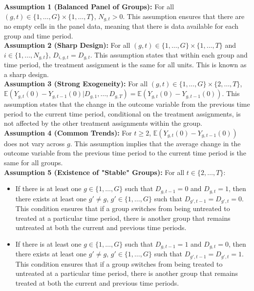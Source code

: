 \documentclass[10pt, oneside]{book}
\begin{document}
\textbf{Assumption 1 (Balanced Panel of Groups):} For all $(g,t) \in \{1, \ldots, G\} \times \{1, \ldots, T\}$, $N_{g,t} > 0$. This assumption ensures that there are no empty cells in the panel data, meaning that there is data available for each group and time period. \\

\textbf{Assumption 2 (Sharp Design):} For all $(g,t) \in \{1, \ldots, G\} \times \{1, \ldots, T\}$ and $i \in \{1, \ldots, N_{g,t}\}$, $D_{i,g,t} = D_{g,t}$. This assumption states that within each group and time period, the treatment assignment is the same for all units. This is known as a sharp design. \\

\textbf{Assumption 3 (Strong Exogeneity):} For all $(g,t) \in \{1, \ldots, G\} \times \{2, \ldots, T\}$, $\mathbb{E}(Y_{g,t}(0) - Y_{g,t-1}(0) | D_{g,1}, \ldots, D_{g,T}) = \mathbb{E}(Y_{g,t}(0) - Y_{g,t-1}(0))$. This assumption states that the change in the outcome variable from the previous time period to the current time period, conditional on the treatment assignments, is not affected by the other treatment assignments within the group. \\

\textbf{Assumption 4 (Common Trends):} For $t \geq 2$, $\mathbb{E}(Y_{g,t}(0) - Y_{g,t-1}(0))$ does not vary across $g$. This assumption implies that the average change in the outcome variable from the previous time period to the current time period is the same for all groups. \\

\textbf{Assumption 5 (Existence of "Stable" Groups):} For all $t \in \{2, \ldots, T\}$:
\begin{itemize}
    \item If there is at least one $g \in \{1, \ldots, G\}$ such that $D_{g,t-1} = 0$ and $D_{g,t} = 1$, then there exists at least one $g' \neq g$, $g' \in \{1, \ldots, G\}$ such that $D_{g',t-1} = D_{g',t} = 0$. This condition ensures that if a group switches from being untreated to treated at a particular time period, there is another group that remains untreated at both the current and previous time periods.
    \item If there is at least one $g \in \{1, \ldots, G\}$ such that $D_{g,t-1} = 1$ and $D_{g,t} = 0$, then there exists at least one $g' \neq g$, $g' \in \{1, \ldots, G\}$ such that $D_{g',t-1} = D_{g',t} = 1$. This condition ensures that if a group switches from being treated to untreated at a particular time period, there is another group that remains treated at both the current and previous time periods.
\end{itemize}
\end{document}
